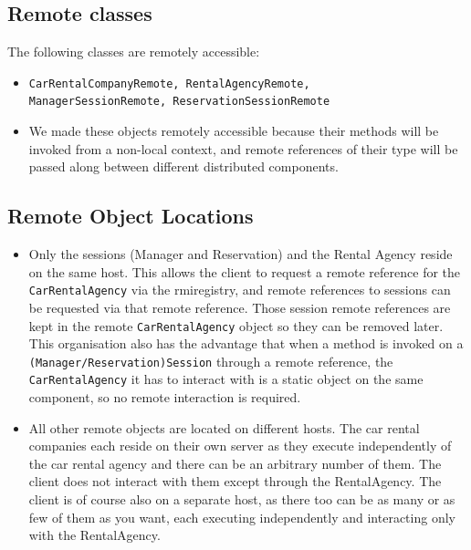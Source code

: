 \documentclass{scrartcl}
\begin{document}
    \subsection{Remote classes}
	The following classes are remotely accessible:
	\begin{itemize}
		\item \texttt{CarRentalCompanyRemote, RentalAgencyRemote,\\ ManagerSessionRemote, ReservationSessionRemote}
		\item We made these objects remotely accessible because their
		methods will be invoked from a non-local context, and remote references
		of their type will be passed along between different distributed components.
	\end{itemize}
	
	\subsection{Remote Object Locations}
	\begin{itemize}
		\item Only the sessions (Manager and Reservation) and the Rental Agency
		reside on the same host. This allows the client to request a remote reference
		for the \texttt{CarRentalAgency} via the rmiregistry, and remote references to sessions can
		be requested via that remote reference. Those session remote references are kept in the remote
		\texttt{CarRentalAgency} object so they can be removed later. This organisation also has the
		advantage that when a method is invoked on a \texttt{(Manager/Reservation)Session} through a
		remote reference, the \texttt{CarRentalAgency} it has to interact with is a static object on
		the same component, so no remote interaction is required.
		\item All other remote objects are located on different hosts. The car rental companies each
		reside on their own server as they execute independently of the car rental agency and there can
		be an arbitrary number of them. The client does not interact with them except through the RentalAgency.
		The client is of course also on a separate host, as there too can be as many or as few of them as
		you want, each executing independently and interacting only with the RentalAgency.
	\end{itemize}
\end{document}
